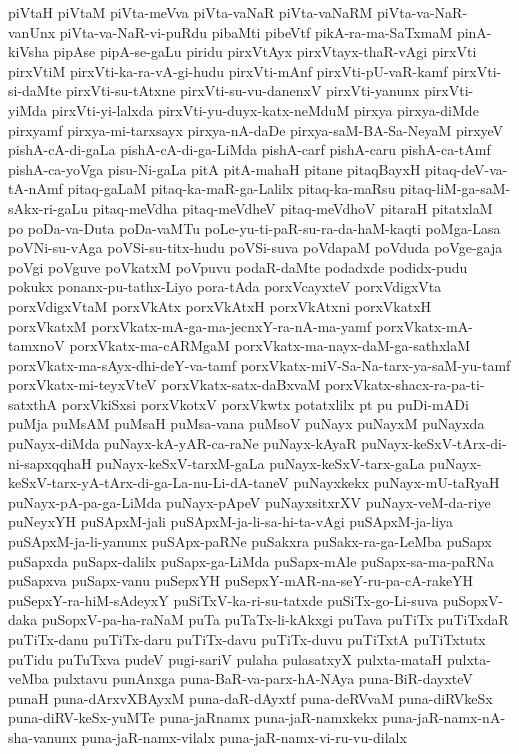 {piVtaH
piVtaM
piVta-meVva
piVta-vaNaR
piVta-vaNaRM
piVta-va-NaR-vanUnx
piVta-va-NaR-vi-puRdu
pibaMti
pibeVtf
pikA-ra-ma-SaTxmaM
pinA-kiVsha
pipAse
pipA-se-gaLu
piridu
pirxVtAyx
pirxVtayx-thaR-vAgi
pirxVti
pirxVtiM
pirxVti-ka-ra-vA-gi-hudu
pirxVti-mAnf
pirxVti-pU-vaR-kamf
pirxVti-si-daMte
pirxVti-su-tAtxne
pirxVti-su-vu-danenxV
pirxVti-yanunx
pirxVti-yiMda
pirxVti-yi-lalxda
pirxVti-yu-duyx-katx-neMduM
pirxya
pirxya-diMde
pirxyamf
pirxya-mi-tarxsayx
pirxya-nA-daDe
pirxya-saM-BA-Sa-NeyaM
pirxyeV
pishA-cA-di-gaLa
pishA-cA-di-ga-LiMda
pishA-carf
pishA-caru
pishA-ca-tAmf
pishA-ca-yoVga
pisu-Ni-gaLa
pitA
pitA-mahaH
pitane
pitaqBayxH
pitaq-deV-va-tA-nAmf
pitaq-gaLaM
pitaq-ka-maR-ga-Lalilx
pitaq-ka-maRsu
pitaq-liM-ga-saM-sAkx-ri-gaLu
pitaq-meVdha
pitaq-meVdheV
pitaq-meVdhoV
pitaraH
pitatxlaM
po
poDa-va-Duta
poDa-vaMTu
poLe-yu-ti-paR-su-ra-da-haM-kaqti
poMga-Lasa
poVNi-su-vAga
poVSi-su-titx-hudu
poVSi-suva
poVdapaM
poVduda
poVge-gaja
poVgi
poVguve
poVkatxM
poVpuvu
podaR-daMte
podadxde
podidx-pudu
pokukx
ponanx-pu-tathx-Liyo
pora-tAda
porxVcayxteV
porxVdigxVta
porxVdigxVtaM
porxVkAtx
porxVkAtxH
porxVkAtxni
porxVkatxH
porxVkatxM
porxVkatx-mA-ga-ma-jecnxY-ra-nA-ma-yamf
porxVkatx-mA-tamxnoV
porxVkatx-ma-cARMgaM
porxVkatx-ma-nayx-daM-ga-sathxlaM
porxVkatx-ma-sAyx-dhi-deY-va-tamf
porxVkatx-miV-Sa-Na-tarx-ya-saM-yu-tamf
porxVkatx-mi-teyxVteV
porxVkatx-satx-daBxvaM
porxVkatx-shacx-ra-pa-ti-satxthA
porxVkiSxsi
porxVkotxV
porxVkwtx
potatxlilx
pt
pu
puDi-mADi
puMja
puMsAM
puMsaH
puMsa-vana
puMsoV
puNayx
puNayxM
puNayxda
puNayx-diMda
puNayx-kA-yAR-ca-raNe
puNayx-kAyaR
puNayx-keSxV-tArx-di-ni-sapxqqhaH
puNayx-keSxV-tarxM-gaLa
puNayx-keSxV-tarx-gaLa
puNayx-keSxV-tarx-yA-tArx-di-ga-La-nu-Li-dA-taneV
puNayxkekx
puNayx-mU-taRyaH
puNayx-pA-pa-ga-LiMda
puNayx-pApeV
puNayxsitxrXV
puNayx-veM-da-riye
puNeyxYH
puSApxM-jali
puSApxM-ja-li-sa-hi-ta-vAgi
puSApxM-ja-liya
puSApxM-ja-li-yanunx
puSApx-paRNe
puSakxra
puSakx-ra-ga-LeMba
puSapx
puSapxda
puSapx-dalilx
puSapx-ga-LiMda
puSapx-mAle
puSapx-sa-ma-paRNa
puSapxva
puSapx-vanu
puSepxYH
puSepxY-mAR-na-seY-ru-pa-cA-rakeYH
puSepxY-ra-hiM-sAdeyxY
puSiTxV-ka-ri-su-tatxde
puSiTx-go-Li-suva
puSopxV-daka
puSopxV-pa-ha-raNaM
puTa
puTaTx-li-kAkxgi
puTava
puTiTx
puTiTxdaR
puTiTx-danu
puTiTx-daru
puTiTx-davu
puTiTx-duvu
puTiTxtA
puTiTxtutx
puTidu
puTuTxva
pudeV
pugi-sariV
pulaha
pulasatxyX
pulxta-mataH
pulxta-veMba
pulxtavu
punAnxga
puna-BaR-va-parx-hA-NAya
puna-BiR-dayxteV
punaH
puna-dArxvXBAyxM
puna-daR-dAyxtf
puna-deRVvaM
puna-diRVkeSx
puna-diRV-keSx-yuMTe
puna-jaRnamx
puna-jaR-namxkekx
puna-jaR-namx-nA-sha-vanunx
puna-jaR-namx-vilalx
puna-jaR-namx-vi-ru-vu-dilalx
}
